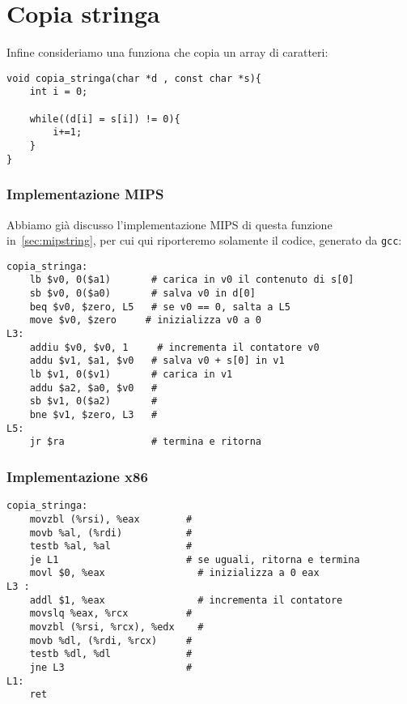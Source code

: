 \documentclass[class=book, crop=false, oneside]{standalone}
\begin{document}
\section{Copia stringa}
Infine consideriamo una funziona che copia un array di caratteri:
\begin{verbatim}
void copia_stringa(char *d , const char *s){
	int i = 0;

	while((d[i] = s[i]) != 0){
		i+=1;
	}
}
\end{verbatim}

\subsubsection{Implementazione MIPS}
Abbiamo già discusso l'implementazione MIPS di questa funzione in~\ref{sec:mipstring}, per cui qui riporteremo solamente il codice, generato da \texttt{gcc}:
\begin{verbatim}
copia_stringa:
	lb $v0, 0($a1)	     # carica in v0 il contenuto di s[0]
	sb $v0, 0($a0)	     # salva v0 in d[0]
	beq $v0, $zero, L5	 # se v0 == 0, salta a L5
	move $v0, $zero	    # inizializza v0 a 0
L3:
	addiu $v0, $v0, 1	  # incrementa il contatore v0
	addu $v1, $a1, $v0	 # salva v0 + s[0] in v1
	lb $v1, 0($v1)	     # carica in v1
	addu $a2, $a0, $v0	 #
	sb $v1, 0($a2)	     #
	bne $v1, $zero, L3	 #
L5:
	jr $ra	             # termina e ritorna
\end{verbatim}

\subsubsection{Implementazione x86}

\begin{verbatim}
copia_stringa:
	movzbl (%rsi), %eax	       #
	movb %al, (%rdi)           #
	testb %al, %al             #
	je L1                      # se uguali, ritorna e termina
	movl $0, %eax	             # inizializza a 0 eax
L3 :
	addl $1, %eax	             # incrementa il contatore
	movslq %eax, %rcx 	       #
	movzbl (%rsi, %rcx), %edx	 #
	movb %dl, (%rdi, %rcx)	   #
	testb %dl, %dl	           #
	jne L3	                   # 
L1:
	ret
\end{verbatim}
\end{document}

